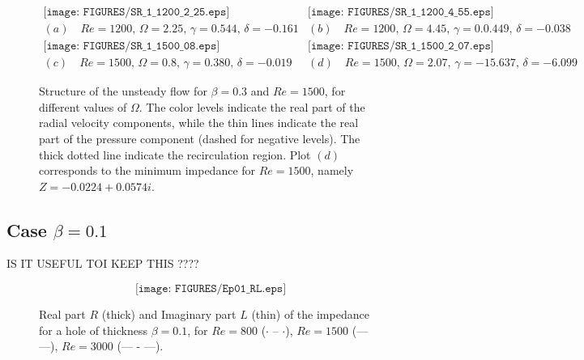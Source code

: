 \documentclass{jfm}
\begin{document}
\begin{figure}
$$
\begin{array}{cc}
\texttt{[image: FIGURES/SR\_1\_1200\_2\_25.eps]} &
\texttt{[image: FIGURES/SR\_1\_1200\_4\_55.eps]} \\
(a) \quad Re = 1200, \, \Omega = 2.25, \, \gamma = 0.544,\, \delta =-0.161 & 
(b) \quad Re = 1200, \, \Omega = 4.45,  \, \gamma = 0.0.449,\, \delta =-0.038 \\
\texttt{[image: FIGURES/SR\_1\_1500\_08.eps]} &
\texttt{[image: FIGURES/SR\_1\_1500\_2\_07.eps]} \\
(c) \quad Re = 1500, \, \Omega = 0.8,  \, \gamma = 0.380,\, \delta =-0.019 & 
(d) \quad Re = 1500, \, \Omega = 2.07,  \, \gamma = -15.637,\, \delta =-6.099
\end{array}
$$
\caption{ Structure of the unsteady flow for $\beta = 0.3$ and $Re = 1500$, for different values of $\Omega$.
The color levels indicate the real part of the radial velocity components, while the thin lines indicate the real part of the pressure component (dashed for negative levels). The thick dotted line indicate the recirculation region. 
Plot $(d)$ corresponds to the minimum impedance for $Re=1500$, namely $Z = -0.0224+0.0574i$.
}
\label{fig:Struct1}
\end{figure}





\subsection{Case $\beta = 0.1$}

IS IT USEFUL TOI KEEP THIS ????



\begin{figure}
$$
\texttt{[image: FIGURES/Ep01\_RL.eps]}
$$
\caption{ Real part $R$ (thick) and Imaginary part $L$ (thin) of the impedance
for a hole of thickness $\beta = 0.1$, for $Re = 800$ ($\cdot$ -- $\cdot$), 
$Re = 1500$ (---  ---), $Re = 3000$ (--- - ---).
}
\label{fig:Cond01}
\end{figure}
\end{document}
